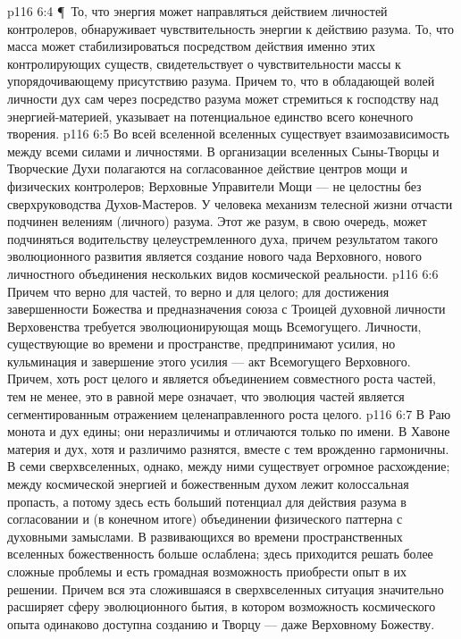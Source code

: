 \vs p116 6:4 \P\ То, что энергия может направляться действием личностей контролеров, обнаруживает чувствительность энергии к действию разума. То, что масса может стабилизироваться посредством действия именно этих контролирующих существ, свидетельствует о чувствительности массы к упорядочивающему присутствию разума. Причем то, что в обладающей волей личности дух сам через посредство разума может стремиться к господству над энергией\hyp{}материей, указывает на потенциальное единство всего конечного творения.
\vs p116 6:5 Во всей вселенной вселенных существует взаимозависимость между всеми силами и личностями. В организации вселенных Сыны\hyp{}Творцы и Творческие Духи полагаются на согласованное действие центров мощи и физических контролеров; Верховные Управители Мощи --- не целостны без сверхруководства Духов\hyp{}Мастеров. У человека механизм телесной жизни отчасти подчинен велениям (личного) разума. Этот же разум, в свою очередь, может подчиняться водительству целеустремленного духа, причем результатом такого эволюционного развития является создание нового чада Верховного, нового личностного объединения нескольких видов космической реальности.
\vs p116 6:6 Причем что верно для частей, то верно и для целого; для достижения завершенности Божества и предназначения союза с Троицей духовной личности Верховенства требуется эволюционирующая мощь Всемогущего. Личности, существующие во времени и пространстве, предпринимают усилия, но кульминация и завершение этого усилия --- акт Всемогущего Верховного. Причем, хоть рост целого и является объединением совместного роста частей, тем не менее, это в равной мере означает, что эволюция частей является сегментированным отражением целенаправленного роста целого.
\vs p116 6:7 В Раю монота и дух едины; они неразличимы и отличаются только по имени. В Хавоне материя и дух, хотя и различимо разнятся, вместе с тем врожденно гармоничны. В семи сверхвселенных, однако, между ними существует огромное расхождение; между космической энергией и божественным духом лежит колоссальная пропасть, а потому здесь есть больший потенциал для действия разума в согласовании и (в конечном итоге) объединении физического паттерна с духовными замыслами. В развивающихся во времени пространственных вселенных божественность больше ослаблена; здесь приходится решать более сложные проблемы и есть громадная возможность приобрести опыт в их решении. Причем вся эта сложившаяся в сверхвселенных ситуация значительно расширяет сферу эволюционного бытия, в котором возможность космического опыта одинаково доступна созданию и Творцу --- даже Верховному Божеству.
